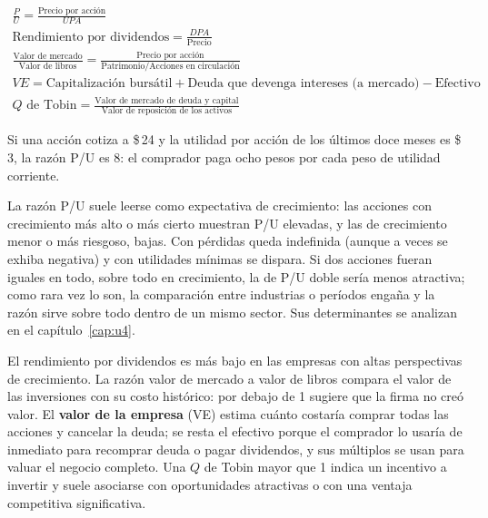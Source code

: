 \begin{formulaBox}
\[
\begin{gathered}
\frac{P}{U} = \frac{\text{Precio por acción}}{UPA}
\\[4pt]
\text{Rendimiento por dividendos} = \frac{DPA}{\text{Precio}}
\\[4pt]
\frac{\text{Valor de mercado}}{\text{Valor de libros}} = \frac{\text{Precio por acción}}{\text{Patrimonio}/\text{Acciones en circulación}}
\\[4pt]
VE = \text{Capitalización bursátil} + \text{Deuda que devenga intereses (a mercado)} - \text{Efectivo}
\\[4pt]
Q \text{ de Tobin} = \frac{\text{Valor de mercado de deuda y capital}}{\text{Valor de reposición de los activos}}
\end{gathered}
\]
\end{formulaBox}

\begin{ejemplo}
Si una acción cotiza a \$\,24 y la utilidad por acción de los últimos doce meses es \$\,3, la razón P/U es 8: el comprador paga ocho pesos por cada peso de utilidad corriente.
\end{ejemplo}

La razón P/U suele leerse como expectativa de crecimiento: las acciones con crecimiento más alto o más cierto muestran P/U elevadas, y las de crecimiento menor o más riesgoso, bajas. Con pérdidas queda indefinida (aunque a veces se exhiba negativa) y con utilidades mínimas se dispara. Si dos acciones fueran iguales en todo, sobre todo en crecimiento, la de P/U doble sería menos atractiva; como rara vez lo son, la comparación entre industrias o períodos engaña y la razón sirve sobre todo dentro de un mismo sector. Sus determinantes se analizan en el capítulo~\ref{cap:u4}.

El rendimiento por dividendos es más bajo en las empresas con altas perspectivas de crecimiento. La razón valor de mercado a valor de libros compara el valor de las inversiones con su costo histórico: por debajo de 1 sugiere que la firma no creó valor. El \textbf{valor de la empresa} (VE) estima cuánto costaría comprar todas las acciones y cancelar la deuda; se resta el efectivo porque el comprador lo usaría de inmediato para recomprar deuda o pagar dividendos, y sus múltiplos se usan para valuar el negocio completo. Una $Q$ de Tobin mayor que 1 indica un incentivo a invertir y suele asociarse con oportunidades atractivas o con una ventaja competitiva significativa.

